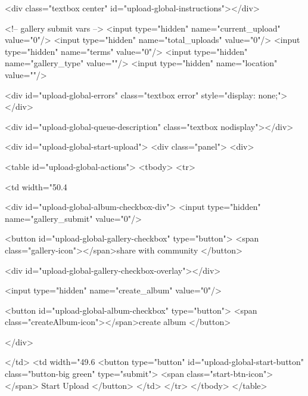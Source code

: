         <div class="textbox center" id="upload-global-instructions"></div>

        <!-- gallery submit vars -->
        <input type="hidden" name="current_upload" value="0"/>
        <input type="hidden" name="total_uploads" value="0"/>
        <input type="hidden" name="terms" value="0"/>
        <input type="hidden" name="gallery_type" value=""/>
        <input type="hidden" name="location" value=""/>


        <div id="upload-global-errors" class="textbox error" style="display: none;"></div>

        <div id="upload-global-queue-description" class="textbox nodisplay"></div>

        <div id="upload-global-start-upload">
            <div class="panel">
                <div>

                    <table id="upload-global-actions">
                        <tbody>
                            <tr>

                                <td width="50.4%

                                    <div id="upload-global-album-checkbox-div">
                                        <input type="hidden" name="gallery_submit" value="0"/>

                                        <button id="upload-global-gallery-checkbox" type="button">
                                            <span class="gallery-icon"></span>share with community
                                        </button>

                                        <div id="upload-global-gallery-checkbox-overlay"></div>

                                        <input type="hidden" name="create_album" value="0"/>

                                        <button id="upload-global-album-checkbox" type="button">
                                            <span class="createAlbum-icon"></span>create album
                                        </button>

                                    </div>

                                </td>
                                <td width="49.6%
                                    <button type="button" id="upload-global-start-button" class="button-big green" type="submit">
                                        <span class="start-btn-icon"></span>
                                        Start Upload
                                    </button>
                                </td>
                            </tr>
                        </tbody>
                    </table>

